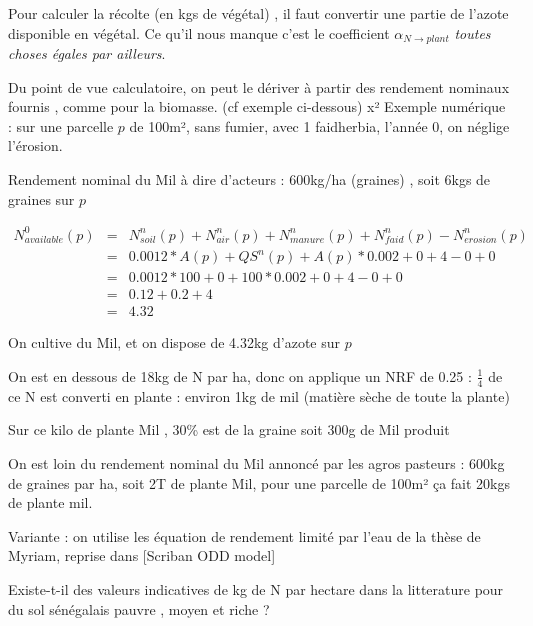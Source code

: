 \documentclass[10pt,a4paper,french]{article} %
\begin{document}
Pour calculer la récolte (en kgs de végétal) , il faut convertir une partie de l'azote disponible en végétal.
Ce qu'il nous manque c'est le coefficient $\alpha_{N \rightarrow plant}$  \emph{toutes choses égales par ailleurs}. 



Du point de vue calculatoire, on peut le dériver à partir des rendement nominaux fournis , comme pour la biomasse. (cf exemple ci-dessous)
x²
Exemple numérique : 
sur une parcelle $p$ de 100m², sans fumier, avec 1 faidherbia, l'année 0, on néglige l'érosion.

Rendement nominal du Mil à dire d'acteurs : 600kg/ha (graines) , soit 6kgs de graines sur $p$

\begin{eqnarray*}
N_{available}^{0}(p)&=&N_{soil}^{n}(p)  +N_{air}^{n}(p)+N_{manure}^{n}(p)+N_{faid}^{n}(p)-N_{erosion}^n(p)  \\
                    &=& 0.0012 * A(p) + QS^{n}(p) + A(p) * 0.002 +0                +4              -0                + 0  \\
                    &=&  0.0012 * 100 + 0 + 100 * 0.002 +0+4-0 + 0  \\
                    &=&  0.12 + 0.2 +4  \\
                    &=& 4.32
\end{eqnarray*}

On cultive  du Mil, et on dispose de 4.32kg d'azote sur $p$

On est en dessous de 18kg de N par ha, donc on applique un NRF de 0.25 : $\frac{1}{4}$ de ce N est converti en plante : environ 1kg de mil (matière sèche de toute la plante)

Sur ce kilo de plante Mil , 30\% est de la graine soit 300g de Mil produit

On est loin du rendement nominal du Mil annoncé par les agros pasteurs : 600kg de graines par ha, soit 2T de plante Mil, pour une parcelle de 100m² ça fait 20kgs de plante mil.  





Variante : on utilise les équation de rendement limité par l'eau de la thèse de Myriam, reprise dans [Scriban ODD model]





\begin{tcolorbox}[noparskip,
    colback=LimeGreen,colframe=Green,%
    colbacklower=LimeGreen!75!LightGreen,%
    title=Question]
Existe-t-il des valeurs indicatives de kg de N par hectare dans la litterature pour du sol sénégalais pauvre , moyen  et  riche  ? 
\end{tcolorbox}
\end{document}
